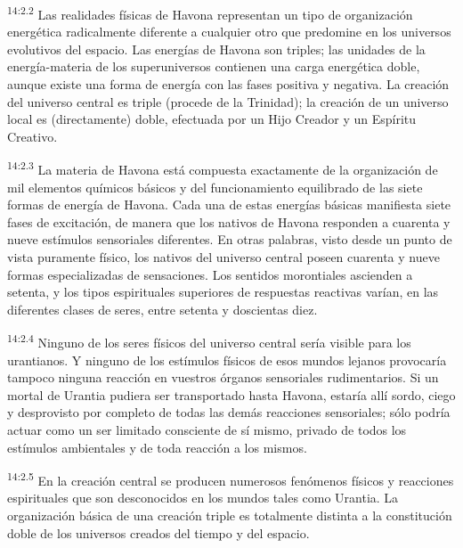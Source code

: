 \par
\textsuperscript{14:2.2} Las realidades físicas de Havona representan un tipo de organización energética radicalmente diferente a cualquier otro que predomine en los universos evolutivos del espacio. Las energías de Havona son triples; las unidades de la energía-materia de los superuniversos contienen una carga energética doble, aunque existe una forma de energía con las fases positiva y negativa. La creación del universo central es triple (procede de la Trinidad); la creación de un universo local es (directamente) doble, efectuada por un Hijo Creador y un Espíritu Creativo.

\par
\textsuperscript{14:2.3} La materia de Havona está compuesta exactamente de la organización de mil elementos químicos básicos y del funcionamiento equilibrado de las siete formas de energía de Havona. Cada una de estas energías básicas manifiesta siete fases de excitación, de manera que los nativos de Havona responden a cuarenta y nueve estímulos sensoriales diferentes. En otras palabras, visto desde un punto de vista puramente físico, los nativos del universo central poseen cuarenta y nueve formas especializadas de sensaciones. Los sentidos morontiales ascienden a setenta, y los tipos espirituales superiores de respuestas reactivas varían, en las diferentes clases de seres, entre setenta y doscientas diez.

\par
\textsuperscript{14:2.4} Ninguno de los seres físicos del universo central sería visible para los urantianos. Y ninguno de los estímulos físicos de esos mundos lejanos provocaría tampoco ninguna reacción en vuestros órganos sensoriales rudimentarios. Si un mortal de Urantia pudiera ser transportado hasta Havona, estaría allí sordo, ciego y desprovisto por completo de todas las demás reacciones sensoriales; sólo podría actuar como un ser limitado consciente de sí mismo, privado de todos los estímulos ambientales y de toda reacción a los mismos.

\par
\textsuperscript{14:2.5} En la creación central se producen numerosos fenómenos físicos y reacciones espirituales que son desconocidos en los mundos tales como Urantia. La organización básica de una creación triple es totalmente distinta a la constitución doble de los universos creados del tiempo y del espacio.

